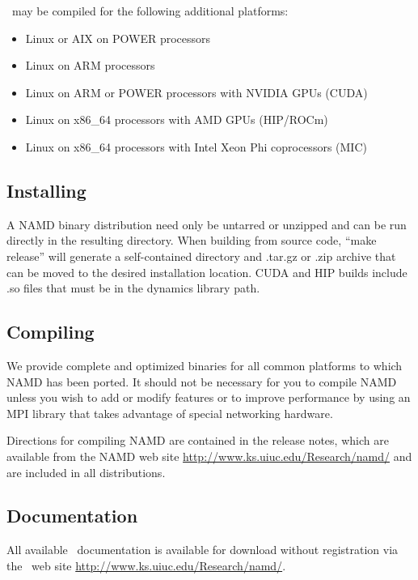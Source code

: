 \NAMD\ may be compiled for the following additional platforms:

\begin{itemize}
\item Linux or AIX on POWER processors
\item Linux on ARM processors
\item Linux on ARM or POWER processors with NVIDIA GPUs (CUDA)
\item Linux on x86\_64 processors with AMD GPUs (HIP/ROCm)
\item Linux on x86\_64 processors with Intel Xeon Phi coprocessors (MIC)
\end{itemize}

\subsection{Installing \NAMD}

A NAMD binary distribution need only be untarred or unzipped and can
be run directly in the resulting directory.  When building from source
code, ``make release'' will generate a
self-contained directory and .tar.gz or .zip archive that can be moved
to the desired installation location.  
CUDA and HIP builds include .so files that must be 
in the dynamics library path.

\subsection{Compiling \NAMD}

We provide complete and optimized binaries for all
common platforms to which NAMD has been ported.
It should not be necessary for you to compile
NAMD unless you wish to add or modify features
or to improve performance by using an MPI library
that takes advantage of special networking hardware.

Directions for compiling NAMD are contained in the release notes,
which are available from the NAMD web site
\url{http://www.ks.uiuc.edu/Research/namd/}
and are included in all distributions.

\subsection{Documentation}

All available \NAMD\ documentation is available for download without
registration via the \NAMD\ web site
\url{http://www.ks.uiuc.edu/Research/namd/}.

